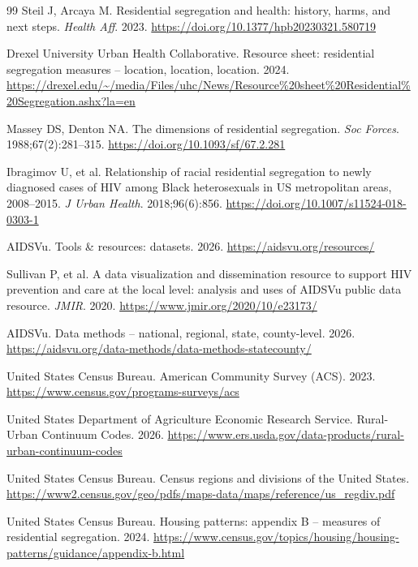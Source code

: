 \documentclass[11pt,letterpaper]{article}
\begin{document}
\begin{thebibliography}{99}
 Steil J, Arcaya M. Residential segregation and health: history, harms, and next steps. \textit{Health Aff}. 2023. \url{https://doi.org/10.1377/hpb20230321.580719}

 Drexel University Urban Health Collaborative. Resource sheet: residential segregation measures -- location, location, location. 2024. \url{https://drexel.edu/~/media/Files/uhc/News/Resource\%20sheet\%20Residential\%20Segregation.ashx?la=en}

 Massey DS, Denton NA. The dimensions of residential segregation. \textit{Soc Forces}. 1988;67(2):281--315. \url{https://doi.org/10.1093/sf/67.2.281}

 Ibragimov U, et al. Relationship of racial residential segregation to newly diagnosed cases of HIV among Black heterosexuals in US metropolitan areas, 2008--2015. \textit{J Urban Health}. 2018;96(6):856. \url{https://doi.org/10.1007/s11524-018-0303-1}

 AIDSVu. Tools \& resources: datasets. 2026. \url{https://aidsvu.org/resources/}

 Sullivan P, et al. A data visualization and dissemination resource to support HIV prevention and care at the local level: analysis and uses of AIDSVu public data resource. \textit{JMIR}. 2020. \url{https://www.jmir.org/2020/10/e23173/}

 AIDSVu. Data methods -- national, regional, state, county-level. 2026. \url{https://aidsvu.org/data-methods/data-methods-statecounty/}

 United States Census Bureau. American Community Survey (ACS). 2023. \url{https://www.census.gov/programs-surveys/acs}

 United States Department of Agriculture Economic Research Service. Rural-Urban Continuum Codes. 2026. \url{https://www.ers.usda.gov/data-products/rural-urban-continuum-codes}

 United States Census Bureau. Census regions and divisions of the United States. \url{https://www2.census.gov/geo/pdfs/maps-data/maps/reference/us_regdiv.pdf}

 United States Census Bureau. Housing patterns: appendix B -- measures of residential segregation. 2024. \url{https://www.census.gov/topics/housing/housing-patterns/guidance/appendix-b.html}


\end{thebibliography}
\end{document}
